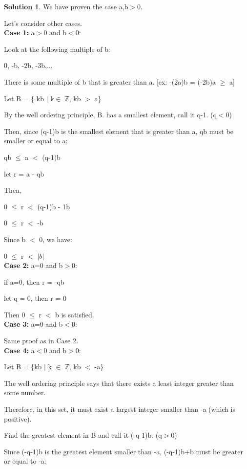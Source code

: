 \documentclass{article}
\theoremstyle{definition}
\newtheorem*{solution}{Solution}
\begin{document}
\begin{solution}
We have proven the case a,b\(>\)0. 

Let's consider other cases.\\

\textbf{Case 1:} a\(>\)0 and b\(<\)0:

Look at the following multiple of b:

0, -b, -2b, -3b,...

There is some multiple of b that is greater than a. [ex: -(2a)b = (-2b)a \(\geq\) a]

Let B = \{ kb \(|\) k\(\in\) \(\mathbb{Z}\), kb \(>\) a\}

By the well ordering principle, B. has a smallest element, call it q-1. (q\(<\)0)

Then, since (q-1)b is the smallest element that is greater than a, qb must be smaller or equal to a:

qb \(\leq\) a \(<\) (q-1)b

let r = a - qb

Then,

0 \(\leq\) r \(<\) (q-1)b - 1b

0 \(\leq\) r \(<\) -b

Since b \(<\) 0, we have:

0 \(\leq\) r \(<\) \(|b|\)\\



\textbf{Case 2:} a=0 and b\(>\)0:

if a=0, then r = -qb

let q = 0, then r = 0

Then 0 \(\leq\) r \(<\) b is satisfied.\\


\textbf{Case 3:} a=0 and b\(<\)0:

Same proof as in Case 2.\\


\textbf{Case 4:} a\(<\)0 and b\(>\)0:

Let B = \{kb \(|\) k \(\in\) \(\mathbb{Z}\), kb \(<\) -a\}

The well ordering principle says that there exists a least integer greater than some number.

Therefore, in this set, it must exist a largest integer smaller than -a (which is positive).

Find the greatest element in B and call it (-q-1)b. (q\(>\)0)

Since (-q-1)b is the greatest element smaller than -a, (-q-1)b+b must be greater or equal to -a:


\end{solution}
\end{document}
